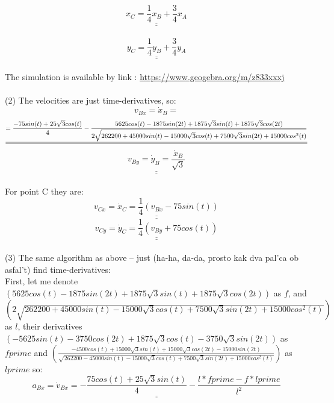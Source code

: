 \documentclass[a4paper,11pt,oneside,article]{memoir}
\def\doubleunderline#1{\underline{\underline{#1}}}
\begin{document}
\begin{equation*}
\doubleunderline{
    x_C = \frac{1}{4}x_B + \frac{3}{4}x_A
    }
\end{equation*}
\\
\begin{equation*}
\doubleunderline{
    y_C = \frac{1}{4}y_B + \frac{3}{4}y_A
    }
\end{equation*}
\\
The simulation is available by link : \url{https://www.geogebra.org/m/z833xxxj}
\\ \\
(2) The velocities are just time-derivatives, so:
\begin{equation*}
    v_{Bx} = \dot x_B =
\end{equation*}
\begin{equation*}
\doubleunderline{
     =\frac{-75sin(t)+25\sqrt{3}cos(t)}{4} - \frac{5625cos(t)-1875sin(2t)+1875\sqrt{3}sin(t)+1875\sqrt{3}cos(2t)}{2\sqrt{262200+45000sin(t)-15000\sqrt{3}cos(t)+7500\sqrt{3}sin(2t)+15000cos^2(t)}}
     }\\
\end{equation*}
\begin{equation*}
\doubleunderline{
    v_{By} = \dot y_B = \frac{\dot x_B}{\sqrt{3}}
}
\end{equation*}
\\
For point C they are:
\begin{equation*}
\doubleunderline{
    v_{Cx} = \dot x_C = \frac{1}{4}(v_{Bx}-75sin(t))
    }
\end{equation*}
\begin{equation*}
\doubleunderline{
    v_{Cy} = \dot y_C = \frac{1}{4}(v_{By}+75cos(t))
    }
\end{equation*}
\\
(3) The same algorithm as above – just (ha-ha, da-da, prosto kak dva pal'ca ob asfal't) find time-derivatives:\\
First, let me denote $(5625cos(t)-1875sin(2t)+1875\sqrt{3}sin(t)+1875\sqrt{3}cos(2t))$ as $f$, and $(2\sqrt{262200+45000sin(t)-15000\sqrt{3}cos(t)+7500\sqrt{3}sin(2t)+15000cos^2(t)})$ as $l$, their derivatives $(-5625sin(t)-3750cos(2t)+1875\sqrt{3}cos(t)-3750\sqrt{3}sin(2t))$ as $fprime$ and $(\frac{-4500cos(t)+15000\sqrt{3}sin(t)+15000\sqrt{3}cos(2t)-15000sin(2t)}{\sqrt{262200-45000sin(t)-15000\sqrt{3}cos(t)+7500\sqrt{3}sin(2t)+15000cos^2(t)}})$ as $lprime$ so:
\begin{equation*}
\doubleunderline{
    a_{Bx} = \dot v_{Bx} = - \frac{75cos(t)+25\sqrt{3}sin(t)}{4}-\frac{l*fprime-f*lprime}{l^2}
}
\end{equation*}
\end{document}
